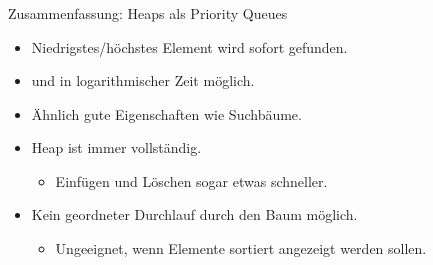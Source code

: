 \begin{frame}
\frametitle{\insertsection}
\begin{block}
{Zusammenfassung: Heaps als Priority Queues}
\begin{itemize}
	\item Niedrigstes/höchstes Element wird sofort gefunden.
	\item {} und  in logarithmischer Zeit möglich.
	\item Ähnlich gute Eigenschaften wie Suchbäume.
	\item[\positive] Heap ist immer vollständig.
	\begin{itemize}
		\item Einfügen und Löschen sogar etwas schneller.
	\end{itemize}
	\item[\negative] Kein geordneter Durchlauf durch den Baum möglich.
	\begin{itemize}
		\item Ungeeignet, wenn Elemente sortiert angezeigt werden sollen.
	\end{itemize}
\end{itemize}
\end{block}
\end{frame}

\endinput

\begin{frame}
\frametitle{\insertsection}
\begin{block}
{}
\end{block}
\end{frame}
